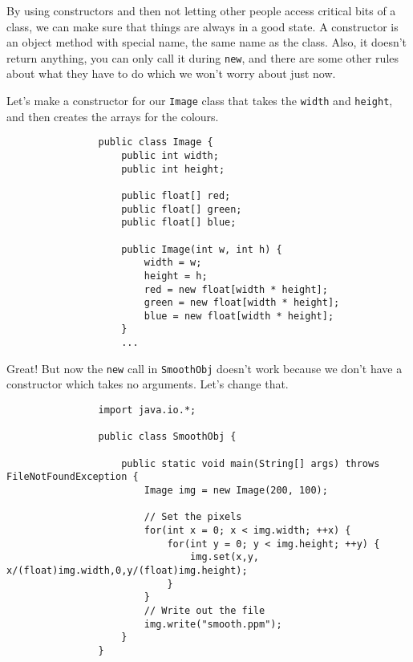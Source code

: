\documentclass{article}
\begin{document}
            By using constructors and then not letting other people access critical bits of a class, we can make sure that things are
            always in a good state. A constructor is an object method with special name, the same name as the class. Also, it doesn't
            return anything, you can only call it during \texttt{new}, and there are some other rules about what they have to do which we
            won't worry about just now.
            
            Let's make a constructor for our \texttt{Image} class that takes the \texttt{width} and \texttt{height}, and then creates the
            arrays for the colours.
            
            \begin{verbatim}
                public class Image {
                    public int width;
                    public int height;
    
                    public float[] red;
                    public float[] green;
                    public float[] blue;    
            
                    public Image(int w, int h) {
                        width = w;
                        height = h;
                        red = new float[width * height];
                        green = new float[width * height];
                        blue = new float[width * height];
                    }
                    ...
            \end{verbatim}
            
            Great! But now the \texttt{new} call in \texttt{SmoothObj} doesn't work because we don't have a constructor which takes no
            arguments.  Let's change that.
            
            \begin{verbatim}
                import java.io.*;

                public class SmoothObj {

                    public static void main(String[] args) throws FileNotFoundException {
                        Image img = new Image(200, 100);
                        
                        // Set the pixels
                        for(int x = 0; x < img.width; ++x) {
                            for(int y = 0; y < img.height; ++y) {
                                img.set(x,y, x/(float)img.width,0,y/(float)img.height);
                            }
                        }
                        // Write out the file
                        img.write("smooth.ppm");
                    }
                }
            \end{verbatim}
        
\end{document}
